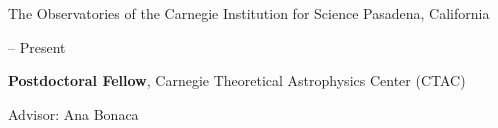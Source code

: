 \documentclass[cv.tex]{subfiles}
\begin{document}
{\color{themecolor} \large
The Observatories of the Carnegie Institution for Science
}
\hfill
Pasadena, California
\par\noindent
\parbox{0.18\textwidth}{%
	 -- Present \par
	\null
}
\hspace{1mm}
\parbox{0.8\textwidth}{%
	\vspace{1mm}
	\textbf{Postdoctoral Fellow}, Carnegie Theoretical Astrophysics Center 
	(CTAC) \par
	Advisor: Ana Bonaca
}
\end{document}
